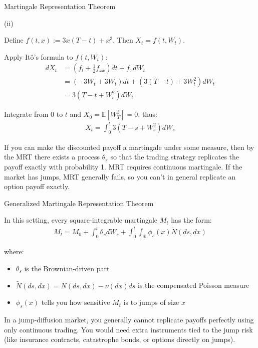\documentclass{beamer}
\begin{document}
\begin{frame}{Martingale Representation Theorem}

    {\footnotesize \footnotesize
    \par (ii)
    \par \par Define $f(t, x) := 3x(T - t) + x^3$. Then $X_t = f(t, W_t)$.
    \par Apply Itô's formula to $f(t, W_t)$:
    \begin{align*}
        dX_t &= \left( f_t + \frac{1}{2} f_{xx} \right) dt + f_x dW_t \\
    &= \left( -3W_t + 3W_t \right) dt + \left( 3(T - t) + 3W_t^2 \right) dW_t \\
    &= 3 \left( T - t + W_t^2 \right) dW_t
    \end{align*}
    \par Integrate from $0$ to $t$ and $X_0 = \mathbb{E}[W_T^3] = 0$, thus:
    \begin{align*}
        X_t = \int_0^t 3 \left( T - s + W_s^2 \right) dW_s
    \end{align*}
    \par If you can make the discounted payoff a martingale under some measure, then by the MRT 
    there exists a process $\theta_s$ so that the trading strategy replicates the payoff exactly with probability 1.
    MRT requires continuous martingale. If the market has jumps, MRT generally fails, 
    so you can't in general replicate an option payoff exactly.
    }

\end{frame} 


\begin{frame}{Generalized Martingale Representation Theorem}

    {\footnotesize \footnotesize
    \par In this setting, every square-integrable martingale $M_t$ has the form:
    \begin{align*}
        M_t = M_0 + \int_0^t \theta_s dW_s + \int_0^t \int_{\mathbb{R}} \phi_s(x) \tilde{N}(ds, dx)
    \end{align*}
    \par  where:
    \begin{itemize}
        \item $\theta_s$ is the Brownian-driven part
        \item $\tilde{N}(ds, dx) = N(ds, dx) - \nu(dx) ds$ is the compensated Poisson measure
        \item $\phi_s(x)$ tells you how sensitive $M_t$ is to jumps of size $x$
    \end{itemize}
    \par In a jump-diffusion market, you generally cannot replicate payoffs perfectly using only continuous trading. 
    You would need extra instruments tied to the jump risk (like insurance contracts, catastrophe bonds, or options directly on jumps).
    }

\end{frame} 
\end{document}

